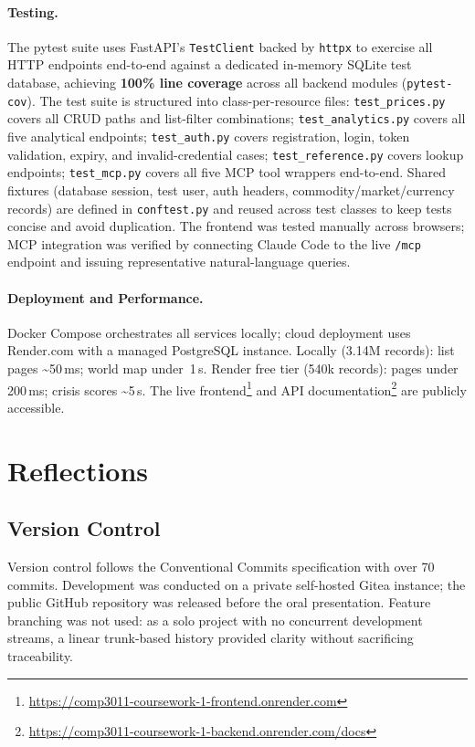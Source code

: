 \paragraph{Testing.}
The pytest suite \parencite{pytest_docs} uses FastAPI's \texttt{TestClient} backed
by \texttt{httpx} to exercise all HTTP endpoints end-to-end against a dedicated
in-memory SQLite test database, achieving \textbf{100\% line coverage} across all
backend modules (\texttt{pytest-cov}).
The test suite is structured into class-per-resource files:
\texttt{test\_prices.py} covers all CRUD paths and list-filter combinations;
\texttt{test\_analytics.py} covers all five analytical endpoints;
\texttt{test\_auth.py} covers registration, login, token validation, expiry, and
invalid-credential cases;
\texttt{test\_reference.py} covers lookup endpoints;
\texttt{test\_mcp.py} covers all five MCP tool wrappers end-to-end.
Shared fixtures (database session, test user, auth headers, commodity/market/currency
records) are defined in \texttt{conftest.py} and reused across test classes to
keep tests concise and avoid duplication.
The frontend was tested manually across browsers; MCP integration was verified
by connecting Claude Code to the live \texttt{/mcp} endpoint
and issuing representative natural-language queries.

\paragraph{Deployment and Performance.}
Docker Compose orchestrates all services locally; cloud deployment uses Render.com
with a managed PostgreSQL instance.
Locally (3.14M records): list pages \textasciitilde50\,ms; world map under~1\,s.
Render free tier (540k records): pages under 200\,ms; crisis scores \textasciitilde5\,s.
The live frontend\footnote{\url{https://comp3011-coursework-1-frontend.onrender.com}}
and API documentation\footnote{\url{https://comp3011-coursework-1-backend.onrender.com/docs}}
are publicly accessible.

\section{Reflections}

\subsection{Version Control}

Version control follows the Conventional Commits specification
\parencite{conventional_commits} with over 70 commits.
Development was conducted on a private self-hosted Gitea instance; the public
GitHub repository was released before the oral presentation.
Feature branching was not used: as a solo project with no concurrent development
streams, a linear trunk-based history provided clarity without sacrificing traceability.

